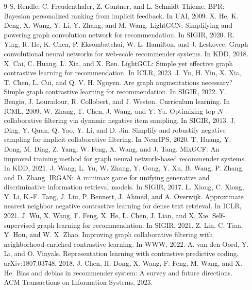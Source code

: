 \documentclass{article}
\begin{document}

\begin{thebibliography}{9}
 S. Rendle, C. Freudenthaler, Z. Gantner, and L. Schmidt-Thieme. BPR:
Bayesian personalized ranking from implicit feedback. In UAI, 2009.
 X. He, K. Deng, X. Wang, Y. Li, Y. Zhang, and M. Wang. LightGCN:
Simplifying and powering graph convolution network for recommendation. In SIGIR, 2020.
 R. Ying, R. He, K. Chen, P. Eksombatchai, W. L. Hamilton, and J.
Leskovec. Graph convolutional neural networks for web-scale recommender systems. In KDD,
2018.
 X. Cai, C. Huang, L. Xia, and X. Ren. LightGCL: Simple yet effective
graph contrastive learning for recommendation. In ICLR, 2023.
 J. Yu, H. Yin, X. Xia, T. Chen, L. Cui, and Q. V. H. Nguyen. Are graph
augmentations necessary? Simple graph contrastive learning for recommendation. In SIGIR,
2022.
 Y. Bengio, J. Louradour, R. Collobert, and J. Weston. Curriculum
learning. In ICML, 2009.
 W. Zhang, T. Chen, J. Wang, and Y. Yu. Optimizing top-$N$ collaborative
filtering via dynamic negative item sampling. In SIGIR, 2013.
 J. Ding, Y. Quan, Q. Yao, Y. Li, and D. Jin. Simplify and robustify
negative sampling for implicit collaborative filtering. In NeurIPS, 2020.
 T. Huang, Y. Dong, M. Ding, Z. Yang, W. Feng, X. Wang, and J. Tang.
MixGCF: An improved training method for graph neural network-based recommender
systems. In KDD, 2021.
 J. Wang, L. Yu, W. Zhang, Y. Gong, Y. Xu, B. Wang, P. Zhang, and D.
Zhang. IRGAN: A minimax game for unifying generative and discriminative information
retrieval models. In SIGIR, 2017.
 L. Xiong, C. Xiong, Y. Li, K.-F. Tang, J. Liu, P. Bennett, J. Ahmed,
and A. Overwijk. Approximate nearest neighbor negative contrastive learning for
dense text retrieval. In ICLR, 2021.
 J. Wu, X. Wang, F. Feng, X. He, L. Chen, J. Lian, and X. Xie.
Self-supervised graph learning for recommendation. In SIGIR, 2021.
 Z. Lin, C. Tian, Y. Hou, and W. X. Zhao. Improving graph collaborative
filtering with neighborhood-enriched contrastive learning. In WWW, 2022.
 A. van den Oord, Y. Li, and O. Vinyals. Representation learning
with contrastive predictive coding. arXiv:1807.03748, 2018.
 J. Chen, H. Dong, X. Wang, F. Feng, M. Wang, and X. He. Bias
and debias in recommender system: A survey and future directions. ACM Transactions
on Information Systems, 2023.
\end{thebibliography}
\end{document}
